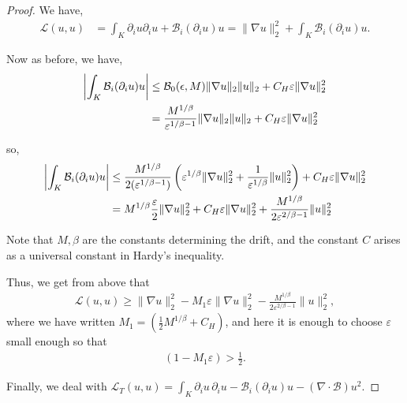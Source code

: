 \documentclass[10pt,a4paper]{amsart}
\newcommand{\eps}{\epsilon}
\begin{document}
\begin{proof}
We have,
\begin{align}
\mathcal{L}(u,u) &= \int_K \partial_i u \partial_i u + \mathcal{B}_i(\partial_i u)u
= \|\nabla u\|_2^2 + \int_K \mathcal{B}_i(\partial_i u)u.
\end{align}

Now as before, we have,
\begin{align}
\left|\int_K \mathcal{B}_i(\partial_i u)u\right|
&\leq \mathcal{B}_0(\eps,M) \|\nabla u\|_2 \|u\|_2 + C_H \varepsilon \|\nabla u\|_2^2 \notag \\
&= \frac{M^{1/\beta}}{\varepsilon^{1/\beta -1}} \|\nabla u\|_2 \|u\|_2 + C_H \varepsilon \|\nabla u\|_2^2
\end{align}

so,
\begin{align}
\left|\int_K \mathcal{B}_i(\partial_i u)u\right|
&\leq \frac{M^{1/\beta}}{2(\varepsilon^{1/\beta -1})}
\left(\varepsilon^{1/\beta}\|\nabla u\|_2^2 + \frac{1}{\varepsilon^{1/\beta}}\|u\|_2^2\right)
+ C_H \varepsilon\|\nabla u\|_2^2 \notag \\
&= M^{1/\beta}\frac{\varepsilon}{2} \|\nabla u\|_2^2 + C_H \varepsilon\|\nabla u\|_2^2
+ \frac{M^{1/\beta}}{2\varepsilon^{2/\beta -1}}\|u\|_2^2
\end{align}

Note that $M, \beta$ are the constants determining the drift, and the constant $C$ arises as a universal constant in Hardy's inequality.

Thus, we get from above that
\begin{align}
\mathcal{L}(u,u) \geq \|\nabla u\|_2^2 - M_1\varepsilon\|\nabla u\|_2^2
- \frac{M^{1/\beta}}{2\varepsilon^{2/\beta -1}}\|u\|_2^2,
\end{align}
where we have written $M_1 = (\frac{1}{2}M^{1/\beta} + C_H)$, and here it is enough to choose $\varepsilon$
small enough so that
\begin{align}\label{eqthree}
(1 - M_1\varepsilon) > \frac{1}{2}.
\end{align}

Finally, we deal with $\mathcal{L}_T(u,u) = \int_K \partial_i u\, \partial_i u
- \mathcal{B}_i(\partial_i u)u - (\nabla\cdot\mathcal{B})u^2$.


\end{proof}
\end{document}
